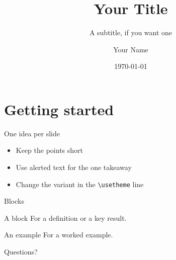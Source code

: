 \documentclass[11pt, aspectratio=169]{beamer}
\title{Your Title}
\subtitle{A subtitle, if you want one}
\author{Your Name}
\institute{Where you are}
\date{\today}
\begin{document}
\begin{frame}
  \titlepage
\end{frame}

\section{Getting started}

\begin{frame}{One idea per slide}
  \begin{itemize}
    \item Keep the points short
    \item Use \alert{alerted text} for the one takeaway
    \item Change the variant in the \texttt{\textbackslash usetheme} line
  \end{itemize}
\end{frame}

\begin{frame}{Blocks}
  \begin{block}{A block}
    For a definition or a key result.
  \end{block}
  \begin{exampleblock}{An example}
    For a worked example.
  \end{exampleblock}
\end{frame}

\begin{frame}[standout]
  Questions?
\end{frame}
\end{document}

